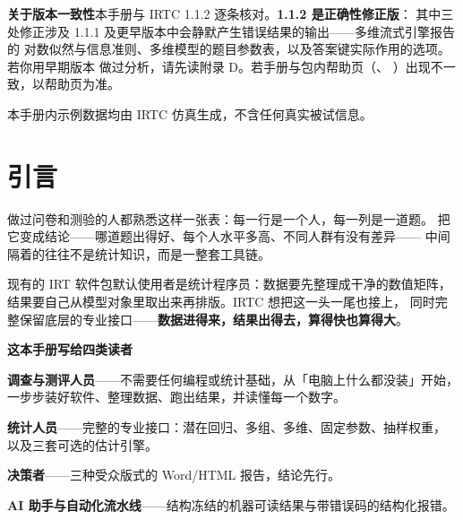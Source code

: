 \vspace{1.0cm}
\begin{tcolorbox}[enhanced, colback=IRTCmist, colframe=IRTCmist, boxrule=0pt,
  arc=2pt, left=13pt, right=13pt, top=10pt, bottom=10pt,
  borderline west={2.8pt}{0pt}{IRTCgold}]
{\fontsize{10}{16}\selectfont\color{IRTCink}
\textbf{关于版本一致性}\quad 本手册与 IRTC 1.1.2 逐条核对。\textbf{1.1.2 是正确性修正版}：
其中三处修正涉及 1.1.1 及更早版本中会静默产生错误结果的输出——多维流式引擎报告的
对数似然与信息准则、多维模型的题目参数表，以及答案键实际作用的选项。若你用早期版本
做过分析，请先读附录 D。若手册与包内帮助页（、
）出现不一致，以帮助页为准。}
\end{tcolorbox}

\vfill
{\LightFont\fontsize{9.5}{14}\selectfont\color{IRTCslate}%
 本手册内示例数据均由 IRTC 仿真生成，不含任何真实被试信息。\par}
\clearpage

\chapter*{引言}

{\fontsize{11.5}{19}\selectfont\color{IRTCink}
做过问卷和测验的人都熟悉这样一张表：每一行是一个人，每一列是一道题。
把它变成结论——哪道题出得好、每个人水平多高、不同人群有没有差异——
中间隔着的往往不是统计知识，而是一整套工具链。\par}

现有的 IRT 软件包默认使用者是统计程序员：数据要先整理成干净的数值矩阵，
结果要自己从模型对象里取出来再排版。IRTC 想把这一头一尾也接上，
同时完整保留底层的专业接口——\textbf{数据进得来，结果出得去，算得快也算得大}。

\vspace{0.05cm}
\begin{tcolorbox}[enhanced, colback=IRTCpaper, colframe=IRTCpaper, boxrule=0pt,
  arc=2pt, left=14pt, right=14pt, top=11pt, bottom=11pt,
  borderline west={2.8pt}{0pt}{IRTCteal}]
{\fontsize{10.5}{17}\selectfont\color{IRTCink}
\textbf{这本手册写给四类读者}\par
\vspace{4pt}
\textbf{调查与测评人员}——不需要任何编程或统计基础，从「电脑上什么都没装」开始，
一步步装好软件、整理数据、跑出结果，并读懂每一个数字。\par
\textbf{统计人员}——完整的专业接口：潜在回归、多组、多维、固定参数、抽样权重，
以及三套可选的估计引擎。\par
\textbf{决策者}——三种受众版式的 Word/HTML 报告，结论先行。\par
\textbf{AI 助手与自动化流水线}——结构冻结的机器可读结果与带错误码的结构化报错。\par}
\end{tcolorbox}

